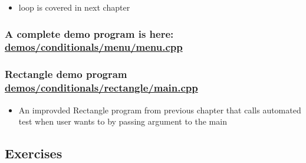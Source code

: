 \documentclass[11pt]{article}
\providecommand{\tightlist}{%
      \setlength{\itemsep}{0pt}\setlength{\parskip}{0pt}}
\begin{document}
\begin{itemize}
\tightlist
\item
  loop is covered in next chapter
\end{itemize}

\hypertarget{a-complete-demo-program-is-here-demosconditionalsmenumenu.cpp}{%
\subsubsection{\texorpdfstring{A complete demo program is here:
\url{demos/conditionals/menu/menu.cpp}}{A complete demo program is here: demos/conditionals/menu/menu.cpp}}\label{a-complete-demo-program-is-here-demosconditionalsmenumenu.cpp}}

\hypertarget{rectangle-demo-program-demosconditionalsrectanglemain.cpp}{%
\subsubsection{\texorpdfstring{Rectangle demo program
\url{demos/conditionals/rectangle/main.cpp}}{Rectangle demo program demos/conditionals/rectangle/main.cpp}}\label{rectangle-demo-program-demosconditionalsrectanglemain.cpp}}

\begin{itemize}
\tightlist
\item
  An improvded Rectangle program from previous chapter that calls
  automated test when user wants to by passing argument to the main
\end{itemize}

    \hypertarget{exercises}{%
\subsection{Exercises}\label{exercises}}
\end{document}
